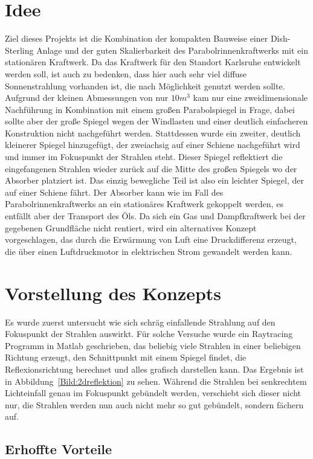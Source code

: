 \documentclass[fontsize=10pt,paper=a4,bibliography=totoc]{scrartcl}
\begin{document}
\section{Idee}
Ziel dieses Projekts ist die Kombination der kompakten Bauweise einer Dish-Sterling Anlage und der guten Skalierbarkeit des Parabolrinnenkraftwerks mit ein stationären Kraftwerk. Da das Kraftwerk für den Standort Karlsruhe entwickelt werden soll, ist auch zu bedenken, dass hier auch sehr viel diffuse Sonnenstrahlung vorhanden ist, die nach Möglichkeit genutzt werden sollte. Aufgrund der kleinen Abmessungen von nur $10\unit{m}^3$ kam nur eine zweidimensionale Nachführung in Kombination mit einem großen Parabolspiegel in Frage, dabei sollte aber der große Spiegel wegen der Windlasten und einer deutlich einfacheren Konstruktion nicht nachgeführt werden. Stattdessen wurde ein zweiter, deutlich kleinerer Spiegel hinzugefügt, der zweiachsig auf einer Schiene nachgeführt wird und immer im Fokuspunkt der Strahlen steht. Dieser Spiegel reflektiert die eingefangenen Strahlen wieder zurück auf die Mitte des großen Spiegels wo der Absorber platziert ist. Das einzig bewegliche Teil ist also ein leichter Spiegel, der auf einer Schiene fährt. Der Absorber kann wie im Fall des Parabolrinnenkraftwerks an ein stationäres Kraftwerk gekoppelt werden, es entfällt aber der Transport des Öls. Da sich ein Gas und Dampfkraftwerk bei der gegebenen Grundfläche nicht rentiert, wird ein alternatives Konzept vorgeschlagen, das durch die Erwärmung von Luft eine Druckdifferenz erzeugt, die über einen Luftdruckmotor in elektrischen Strom gewandelt werden kann. 
\section{Vorstellung des Konzepts}
Es wurde zuerst untersucht wie sich schräg einfallende Strahlung auf den Fokuspunkt der Strahlen auswirkt. Für solche Versuche wurde ein Raytracing Programm in Matlab geschrieben, das beliebig viele Strahlen in einer beliebigen Richtung erzeugt, den Schnittpunkt mit einem Spiegel findet, die Reflexionsrichtung berechnet und alles grafisch darstellen kann. Das Ergebnis ist in Abbildung~\ref{Bild:2dreflektion} zu sehen. Während die Strahlen bei senkrechtem Lichteinfall genau im Fokuspunkt gebündelt werden, verschiebt sich dieser nicht nur, die Strahlen werden nun auch nicht mehr so gut gebündelt, sondern fächern auf. 
\subsection{Erhoffte Vorteile}
\end{document}
